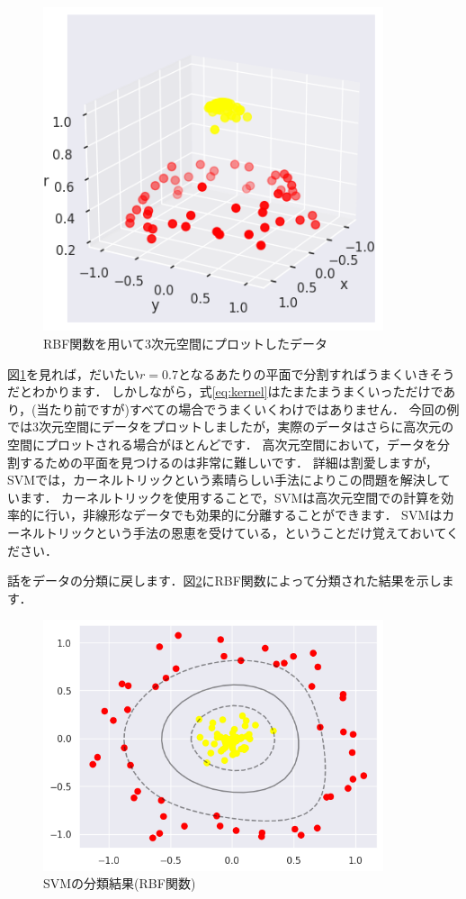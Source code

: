 \documentclass{jarticle}
\begin{document}
\begin{figure}[H]
  \centering
  \includegraphics[width=10cm]{fig/SVM_RBF.png}
  \caption{RBF関数を用いて3次元空間にプロットしたデータ}
  \label{fig:3d_data}
\end{figure}

図\ref{fig:3d_data}を見れば，だいたい$r=0.7$となるあたりの平面で分割すればうまくいきそうだとわかります．
しかしながら，式\ref{eq:kernel}はたまたまうまくいっただけであり，(当たり前ですが)すべての場合でうまくいくわけではありません．
今回の例では3次元空間にデータをプロットしましたが，実際のデータはさらに高次元の空間にプロットされる場合がほとんどです．
高次元空間において，データを分割するための平面を見つけるのは非常に難しいです．
詳細は割愛しますが，SVMでは，カーネルトリックという素晴らしい手法によりこの問題を解決しています．
カーネルトリックを使用することで，SVMは高次元空間での計算を効率的に行い，非線形なデータでも効果的に分離することができます．
SVMはカーネルトリックという手法の恩恵を受けている，ということだけ覚えておいてください．

話をデータの分類に戻します．図\ref{fig:svm_RBF}にRBF関数によって分類された結果を示します．

\begin{figure}[H]
  \centering
  \includegraphics[width=10cm]{fig/svm_rbf_db.png}
  \caption{SVMの分類結果(RBF関数)}
  \label{fig:svm_RBF}
\end{figure}
\end{document}
